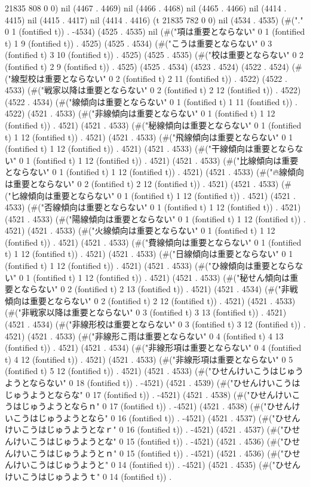 21835 808 0 0) nil (4467 . 4469) nil (4466 . 4468) nil (4465 . 4466) nil (4414 . 4415) nil (4415 . 4417) nil (4414 . 4416) (t 21835 782 0 0) nil (4534 . 4535) (#("." 0 1 (fontified t)) . -4534) (4525 . 4535) nil (#("項は重要とならない" 0 1 (fontified t) 1 9 (fontified t)) . 4525) (4525 . 4534) (#("こうは重要とならない" 0 3 (fontified t) 3 10 (fontified t)) . 4525) (4525 . 4535) (#("校は重要とならない" 0 2 (fontified t) 2 9 (fontified t)) . 4525) (4525 . 4534) (4523 . 4524) (4522 . 4524) (#("線型校は重要とならない" 0 2 (fontified t) 2 11 (fontified t)) . 4522) (4522 . 4533) (#("戦家以降は重要とならない" 0 2 (fontified t) 2 12 (fontified t)) . 4522) (4522 . 4534) (#("線傾向は重要とならない" 0 1 (fontified t) 1 11 (fontified t)) . 4522) (4521 . 4533) (#("非線傾向は重要とならない" 0 1 (fontified t) 1 12 (fontified t)) . 4521) (4521 . 4533) (#("秘線傾向は重要とならない" 0 1 (fontified t) 1 12 (fontified t)) . 4521) (4521 . 4533) (#("飛線傾向は重要とならない" 0 1 (fontified t) 1 12 (fontified t)) . 4521) (4521 . 4533) (#("干線傾向は重要とならない" 0 1 (fontified t) 1 12 (fontified t)) . 4521) (4521 . 4533) (#("比線傾向は重要とならない" 0 1 (fontified t) 1 12 (fontified t)) . 4521) (4521 . 4533) (#("🔥線傾向は重要とならない" 0 2 (fontified t) 2 12 (fontified t)) . 4521) (4521 . 4533) (#("匕線傾向は重要とならない" 0 1 (fontified t) 1 12 (fontified t)) . 4521) (4521 . 4533) (#("否線傾向は重要とならない" 0 1 (fontified t) 1 12 (fontified t)) . 4521) (4521 . 4533) (#("陽線傾向は重要とならない" 0 1 (fontified t) 1 12 (fontified t)) . 4521) (4521 . 4533) (#("火線傾向は重要とならない" 0 1 (fontified t) 1 12 (fontified t)) . 4521) (4521 . 4533) (#("費線傾向は重要とならない" 0 1 (fontified t) 1 12 (fontified t)) . 4521) (4521 . 4533) (#("日線傾向は重要とならない" 0 1 (fontified t) 1 12 (fontified t)) . 4521) (4521 . 4533) (#("ひ線傾向は重要とならない" 0 1 (fontified t) 1 12 (fontified t)) . 4521) (4521 . 4533) (#("秘せん傾向は重要とならない" 0 2 (fontified t) 2 13 (fontified t)) . 4521) (4521 . 4534) (#("非戦傾向は重要とならない" 0 2 (fontified t) 2 12 (fontified t)) . 4521) (4521 . 4533) (#("非戦家以降は重要とならない" 0 3 (fontified t) 3 13 (fontified t)) . 4521) (4521 . 4534) (#("非線形校は重要とならない" 0 3 (fontified t) 3 12 (fontified t)) . 4521) (4521 . 4533) (#("非線形こ雨は重要とならない" 0 4 (fontified t) 4 13 (fontified t)) . 4521) (4521 . 4534) (#("非線形項は重要とならない" 0 4 (fontified t) 4 12 (fontified t)) . 4521) (4521 . 4533) (#("非線形項は重要とならない" 0 5 (fontified t) 5 12 (fontified t)) . 4521) (4521 . 4533) (#("ひせんけいこうはじゅうようとならない" 0 18 (fontified t)) . -4521) (4521 . 4539) (#("ひせんけいこうはじゅうようとならな" 0 17 (fontified t)) . -4521) (4521 . 4538) (#("ひせんけいこうはじゅうようとならｎ" 0 17 (fontified t)) . -4521) (4521 . 4538) (#("ひせんけいこうはじゅうようとなら" 0 16 (fontified t)) . -4521) (4521 . 4537) (#("ひせんけいこうはじゅうようとなｒ" 0 16 (fontified t)) . -4521) (4521 . 4537) (#("ひせんけいこうはじゅうようとな" 0 15 (fontified t)) . -4521) (4521 . 4536) (#("ひせんけいこうはじゅうようとｎ" 0 15 (fontified t)) . -4521) (4521 . 4536) (#("ひせんけいこうはじゅうようと" 0 14 (fontified t)) . -4521) (4521 . 4535) (#("ひせんけいこうはじゅうようｔ" 0 14 (fontified t)) . 